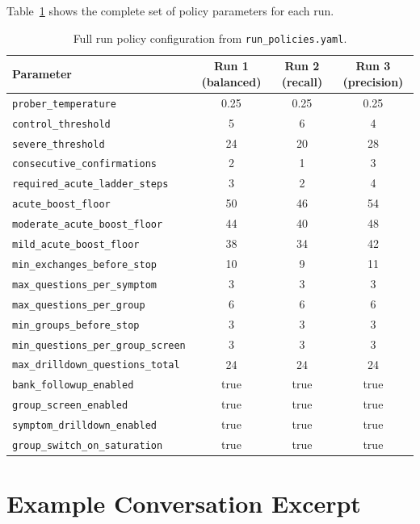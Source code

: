 \documentclass[]{ceurart}
\begin{document}
Table~\ref{tab:fullpolicy} shows the complete set of policy parameters for each run.

\begin{table}[t]
\caption{Full run policy configuration from \texttt{run\_policies.yaml}.}
\label{tab:fullpolicy}
\centering
\small
\begin{tabular}{lccc}
\toprule
\textbf{Parameter} & \textbf{Run 1 (balanced)} & \textbf{Run 2 (recall)} & \textbf{Run 3 (precision)} \\
\midrule
\texttt{prober\_temperature}             & 0.25 & 0.25 & 0.25 \\
\texttt{control\_threshold}              & 5    & 6    & 4    \\
\texttt{severe\_threshold}               & 24   & 20   & 28   \\
\texttt{consecutive\_confirmations}      & 2    & 1    & 3    \\
\texttt{required\_acute\_ladder\_steps}  & 3    & 2    & 4    \\
\texttt{acute\_boost\_floor}             & 50   & 46   & 54   \\
\texttt{moderate\_acute\_boost\_floor}   & 44   & 40   & 48   \\
\texttt{mild\_acute\_boost\_floor}       & 38   & 34   & 42   \\
\texttt{min\_exchanges\_before\_stop}    & 10   & 9    & 11   \\
\texttt{max\_questions\_per\_symptom}    & 3    & 3    & 3    \\
\texttt{max\_questions\_per\_group}      & 6    & 6    & 6    \\
\texttt{min\_groups\_before\_stop}       & 3    & 3    & 3    \\
\texttt{min\_questions\_per\_group\_screen} & 3 & 3    & 3    \\
\texttt{max\_drilldown\_questions\_total}& 24   & 24   & 24   \\
\texttt{bank\_followup\_enabled}         & true & true & true \\
\texttt{group\_screen\_enabled}          & true & true & true \\
\texttt{symptom\_drilldown\_enabled}     & true & true & true \\
\texttt{group\_switch\_on\_saturation}   & true & true & true \\
\bottomrule
\end{tabular}
\end{table}

\section{Example Conversation Excerpt}\label{app:conversation}
\end{document}
